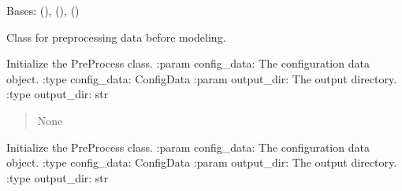 \documentclass[a4paper,11pt,english,openany]{sphinxmanual}
\begin{document}
\begin{fulllineitems}
\label{\detokenize{api/spyice.preprocess.pre_process:spyice.preprocess.pre_process.PreProcess}}
\pysigstartsignatures
{}
\pysigstopsignatures
\sphinxAtStartPar
Bases: {\hyperref[\detokenize{api/spyice.parameters.user_input:spyice.parameters.user_input.UserInput}]{}} (), {\hyperref[\detokenize{api/spyice.preprocess.geometry_settings:spyice.preprocess.geometry_settings.GeometrySettings}]{}} (), {\hyperref[\detokenize{api/spyice.parameters.results_params:spyice.parameters.results_params.ResultsParams}]{}} ()

\sphinxAtStartPar
Class for preprocessing data before modeling.

\sphinxAtStartPar
Initialize the PreProcess class.
:param config\_data: The configuration data object.
:type config\_data: ConfigData
:param output\_dir: The output directory.
:type output\_dir: str
\begin{quote}\begin{description}
\sphinxAtStartPar
{} \textendash{} 

\sphinxAtStartPar
None

\end{description}\end{quote}

\begin{fulllineitems}
\label{\detokenize{api/spyice.preprocess.pre_process:spyice.preprocess.pre_process.PreProcess.__init__}}
\pysigstartsignatures
{}
\pysigstopsignatures
\sphinxAtStartPar
Initialize the PreProcess class.
:param config\_data: The configuration data object.
:type config\_data: ConfigData
:param output\_dir: The output directory.
:type output\_dir: str
\begin{quote}\begin{description}
\sphinxAtStartPar
{} \textendash{} 


\end{description}
\end{quote}
\end{fulllineitems}
\end{fulllineitems}
\end{document}
